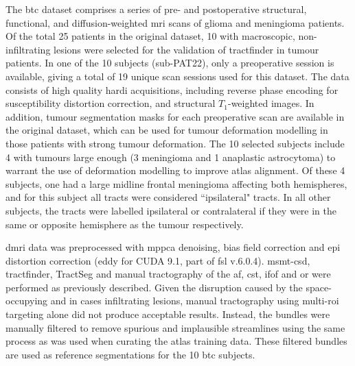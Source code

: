 The \gls{btc} dataset\autocite{Aerts2020a,Aerts2022a,Aerts2022} comprises a series of pre- and postoperative structural, functional, and diffusion-weighted \gls{mri} scans of glioma and meningioma patients.
Of the total 25 patients in the original dataset, 10 with macroscopic, non-infiltrating lesions were selected for the validation of tractfinder in tumour patients.
In one of the 10 subjects (sub-PAT22), only a preoperative session is available, giving a total of 19 unique scan sessions used for this dataset.
The data consists of high quality \gls{hardi} acquisitions, including reverse phase encoding for susceptibility distortion correction, and structural $T_1$-weighted images.
In addition, tumour segmentation masks for each preoperative scan are available in the original dataset, which can be used for tumour deformation modelling in those patients with strong tumour deformation.
The 10 selected subjects include 4 with tumours large enough (3 meningioma and 1 anaplastic astrocytoma) to warrant the use of deformation modelling to improve atlas alignment.
Of these 4 subjects, one had a large midline frontal meningioma affecting both hemispheres, and for this subject all tracts were considered ``ipsilateral" tracts.
In all other subjects, the tracts were labelled ipsilateral or contralateral if they were in the same or opposite hemisphere as the tumour respectively.

\Gls{dmri} data was preprocessed with \gls{mppca} denoising, bias field correction and \gls{epi} distortion correction (eddy for CUDA 9.1, part of \gls{fsl} v.6.0.4).
\Gls{msmt}-\gls{csd}, tractfinder, TractSeg and manual tractography of the \gls{af}, \gls{cst}, \gls{ifof} and \gls{or} were performed as previously described.
Given the disruption caused by the space-occupying and in cases infiltrating lesions, manual tractography using multi-\gls{roi} targeting alone did not produce acceptable results.
Instead, the bundles were manually filtered to remove spurious and implausible streamlines using the same process as was used when curating the atlas training data.
These filtered bundles are used as reference segmentations for the 10 \gls{btc} subjects.

